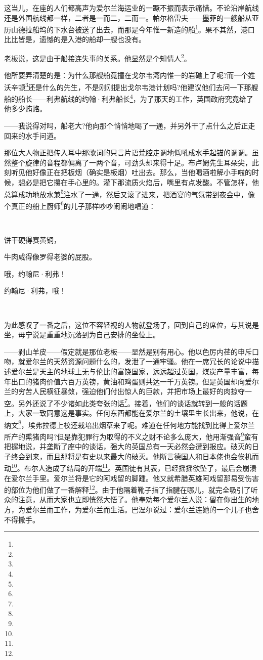 \par 这当儿，在座的人们都高声为爱尔兰海运业的一蹶不振而表示痛惜。不论沿岸航线还是外国航线都一样，二者是一而二，二而一。帕尔格雷夫——墨菲的一艘船从亚历山德拉船坞的下水台被送了出去，而那是今年惟一新造的船\footnote{}。果不其然，港口比比皆是，遗憾的是入港的船却一艘也没有。
\par 老板说，这是由于船接连失事的关系。他显然是个知情人\footnote{}。
\par 他所要弄清楚的是：为什么那艘船竟撞在戈尔韦湾内惟一的岩礁上了呢?而一个姓沃辛顿\footnote{}还是什么的先生，不是刚刚提出戈尔韦港计划吗?他建议他们去问一下那艘船的船长——利弗航线的约翰·利弗船长\footnote{}，为了那天的工作，英国政府究竟给了他多少贿赂。
\par ——我说得对吗，船老大?他向那个悄悄地喝了一通，并另外干了点什么之后正走回来的水手问道。
\par 那位大人物正把传入耳中那歌词的只言片语荒腔走调地低吼成水手起锚的调调。虽然整个旋律的音程都偏离了一两个音，可劲头却来得十足。布卢姆先生耳朵尖，此刻听见他好像正在把板烟（确实是板烟）吐出去。那么，当他喝酒啦解小手啦的时候，想必是把它攥在手心里的。灌下那流质火焰后，嘴里有点发酸。不管怎样，他总算成功地放水兼\footnote{}注水了一通，然后又滚了进来，把酒宴的气氛带到夜会中，像个真正的船上厨师\footnote{}的儿子那样吵吵闹闹地唱道：
\par  
\par 饼干硬得赛黄铜，
\par 牛肉咸得像罗得老婆的屁股。
\par 哦，约翰尼·利弗！
\par 约翰尼·利弗，哦！
\par  
\par 为此感叹了一番之后，这位不容轻视的人物就登场了，回到自己的席位，与其说是坐，毋宁说是重重地沉落到为自己安排的坐位上。
\par ——剥山羊皮——假定就是那位老板——显然是别有用心。他以色厉内荏的申斥口吻，就爱尔兰的天然资源问题什么的，发泄了一通牢骚。他在一席冗长的论说中描述爱尔兰是天主的地球上无与伦比的富饶国家，远远超过英国，煤炭产量丰富，每年出口的猪肉价值六百万英镑，黄油和鸡蛋则共达一千万英镑。但是英国却向爱尔兰的穷苦人民横征暴敛，强迫他们付出惊人的巨款，并把市场上最好的肉掠夺一空。另外还说了不少诸如此类夸张的话\footnote{}。接着，他们的谈话就转到一般的话题上，大家一致同意这是事实。任何东西都能在爱尔兰的土壤里生长出来，他说，在纳文\footnote{}，埃弗拉德上校还栽培出烟草来了呢。难道在任何地方能找到比得上爱尔兰所产的熏猪肉吗?但是靠犯罪行为取得的不义之财不论多么庞大，他用渐强音\footnote{}蛮有把握地说，并垄断了座中的谈话，强大的英国总有一天必然会遭到报应。破灭的日子终会到来，而且那将是有史以来最大的破灭。他断言德国人和日本佬也会俟机而动\footnote{}。布尔人造成了结局的开端\footnote{}。英国徒有其表，已经摇摇欲坠了，最后会崩溃在爱尔兰手里。爱尔兰将是它的阿戏留的脚踵。他又就希腊英雄阿戏留那易受伤害的部位为他们做了一番解释\footnote{}。由于他隔着靴子指了指腱在哪儿，就完全吸引了听众的注意，从而大家也立即恍然大悟了。他奉劝每个爱尔兰人说：留在你出生的地方，为爱尔兰而工作，为爱尔兰而生活。巴涅尔说过：爱尔兰连她的一个儿子也舍不得撒手。
